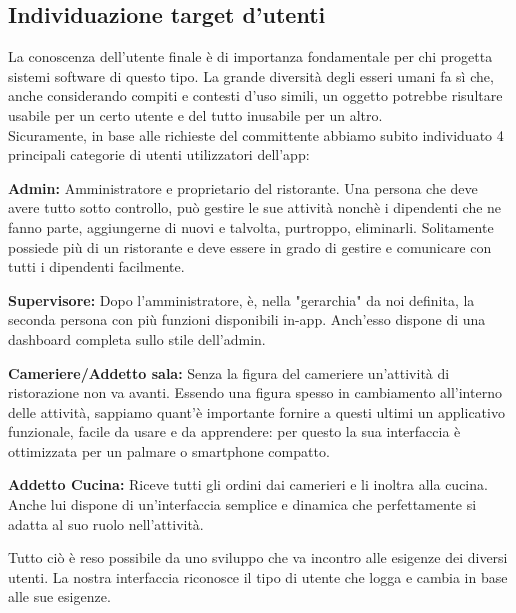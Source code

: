 \subsection{Individuazione target d'utenti}
    \begin{flushleft}
        La conoscenza dell'utente finale è di importanza fondamentale per chi progetta sistemi software di questo tipo. La grande diversità degli esseri umani
        fa sì che, anche considerando compiti e contesti d'uso simili, un oggetto potrebbe risultare usabile per un certo utente e
        del tutto inusabile per un altro.\\
        Sicuramente, in base alle richieste del committente abbiamo subito individuato 4 principali categorie di utenti utilizzatori dell'app:
        \vspace{0.5cm}
       
        \textbf{Admin:} Amministratore e proprietario del ristorante. Una persona che deve avere tutto sotto controllo, può gestire le sue attività nonchè i 
        dipendenti che ne fanno parte, aggiungerne di nuovi e talvolta, purtroppo, eliminarli. Solitamente possiede più di un ristorante e deve essere in grado di gestire e comunicare con tutti i dipendenti facilmente.
        \vspace{0.5cm}

        \textbf{Supervisore:} Dopo l'amministratore, è, nella "gerarchia" da noi definita, la seconda persona con più funzioni disponibili in-app. 
        Anch'esso dispone di una dashboard completa sullo stile dell'admin.
        \vspace{0.5cm}

        \textbf{Cameriere/Addetto sala:} Senza la figura del cameriere un'attività di ristorazione non va avanti. Essendo una figura spesso in cambiamento all'interno delle attività, sappiamo quant'è importante fornire a questi ultimi
        un applicativo funzionale, facile da usare e da apprendere: per questo la sua interfaccia è ottimizzata per un palmare o smartphone compatto. 
        \vspace{0.5cm}


        \textbf{Addetto Cucina:} Riceve tutti gli ordini dai camerieri e li inoltra alla cucina. Anche lui dispone di un'interfaccia semplice e dinamica che perfettamente si adatta al suo ruolo nell'attività.
        \vspace{0.5cm}        
        
        Tutto ciò è reso possibile da uno sviluppo che va incontro alle esigenze dei diversi utenti. La nostra interfaccia riconosce il tipo di utente che logga e cambia
        in base alle sue esigenze. 

    \end{flushleft}


